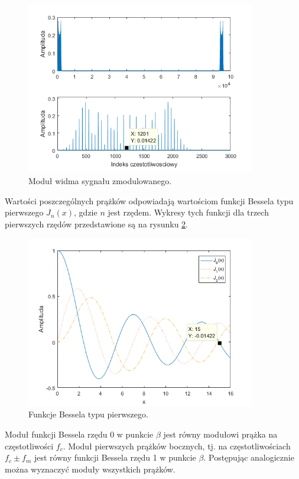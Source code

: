 \begin{figure}[H]
	\centering
	\includegraphics[width=10cm]{grafiki/fm_widmo}
	\captionsetup{justification=centering}
	\caption{Moduł widma sygnału zmodulowanego.}
	\label{rys:fm_widmo}
\end{figure}
Wartości poszczególnych prążków odpowiadają wartościom funkcji Bessela typu pierwszego $J_n(x)$, gdzie $n$ jest rzędem. Wykresy tych funkcji dla trzech pierwszych rzędów przedstawione są na rysunku \ref{rys:fm_bessel}.
\begin{figure}[H]
	\centering
	\includegraphics[width=10cm]{grafiki/fm_bessel}
	\captionsetup{justification=centering}
	\caption{Funkcje Bessela typu pierwszego.}
	\label{rys:fm_bessel}
\end{figure}

Moduł funkcji Bessela rzędu 0 w punkcie $\beta$ jest równy modułowi prążka na częstotliwości $f_c$. Moduł pierwszych prążków bocznych, tj. na częstotliwościach $f_c \pm f_m$ jest równy funkcji Bessela rzędu 1 w punkcie $\beta$. Postępując analogicznie można wyznaczyć moduły wszystkich prążków.